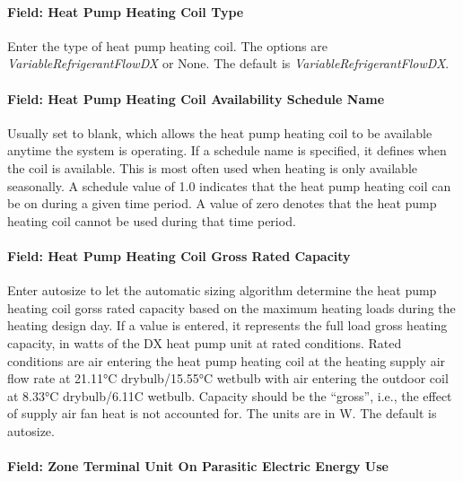 \paragraph{Field: Heat Pump Heating Coil Type}\label{field-heat-pump-heating-coil-type-2}

Enter the type of heat pump heating coil. The options are \emph{VariableRefrigerantFlowDX} or None. The default is \emph{VariableRefrigerantFlowDX}.

\paragraph{Field: Heat Pump Heating Coil Availability Schedule Name}\label{field-heat-pump-heating-coil-availability-schedule-name-1}

Usually set to blank, which allows the heat pump heating coil to be available anytime the system is operating. If a schedule name is specified, it defines when the coil is available. This is most often used when heating is only available seasonally. A schedule value of 1.0 indicates that the heat pump heating coil can be on during a given time period. A value of zero denotes that the heat pump heating coil cannot be used during that time period.

\paragraph{Field: Heat Pump Heating Coil Gross Rated Capacity}\label{field-heat-pump-heating-coil-gross-rated-capacity-2}

Enter autosize to let the automatic sizing algorithm determine the heat pump heating coil gorss rated capacity based on the maximum heating loads during the heating design day. If a value is entered, it represents the full load gross heating capacity, in watts of the DX heat pump unit at rated conditions. Rated conditions are air entering the heat pump heating coil at the heating supply air flow rate at 21.11°C drybulb/15.55°C wetbulb with air entering the outdoor coil at 8.33°C drybulb/6.11C wetbulb. Capacity should be the ``gross'', i.e., the effect of supply air fan heat is not accounted for. The units are in W. The default is autosize.

\paragraph{Field: Zone Terminal Unit On Parasitic Electric Energy Use}\label{field-zone-terminal-unit-on-parasitic-electric-energy-use}

